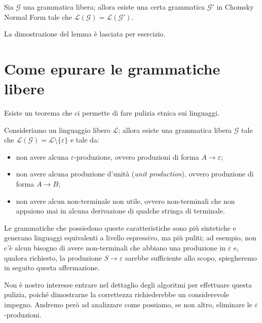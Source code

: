 \documentclass[class=book, crop=false, oneside, 12pt]{standalone}
\begin{document}
\begin{lemma}
  Sia \(\mathcal{G}\) una grammatica libera; allora esiste una certa grammatica \(\mathcal{G'}\) in Chomsky Normal Form tale che \(\mathcal{L(G)} = \mathcal{L(G')}\).
\end{lemma}

\noindent La dimostrazione del lemma è lasciata per esercizio.

\section{Come epurare le grammatiche libere}
Esiste un teorema che ci permette di fare pulizia etnica sui linguaggi.
\begin{theorem}
  Consideriamo un linguaggio libero \(\mathcal{L}\); allora esiste una grammatica libera \(\mathcal{G}\) tale che \(\mathcal{L(G)} = \mathcal{L} \setminus \{ \varepsilon \}\) e tale da:
  \begin{itemize}
    \item non avere alcuna \(\varepsilon\)-produzione, ovvero produzioni di forma \(A \rightarrow \varepsilon\);
    \item non avere alcuna produzione d'unità (\emph{unit production}), ovvero produzione di forma \(A \rightarrow B\);
    \item non avere alcun non-terminale non utile, ovvero non-terminali che non appaiono mai in alcuna derivazione di qualche stringa di terminale.
  \end{itemize}
\end{theorem}

Le grammatiche che possiedono queste caratteristiche sono più sintetiche e generano linguaggi equivalenti a livello espressivo, ma più puliti; ad esempio, non c'è alcun bisogno di avere non-terminali che abbiano una produzione in \(\varepsilon\) e, qualora richiesto, la produzione \(S \rightarrow \varepsilon\) sarebbe sufficiente allo scopo, spiegheremo in seguito questa affermazione.

Non è nostro interesse entrare nel dettaglio degli algoritmi per effettuare questa pulizia, poiché dimostrarne la correttezza richiederebbe un considerevole impegno. Andremo però ad analizzare come possiamo, se non altro,  eliminare le \(\varepsilon\)-produzioni.
\end{document}
